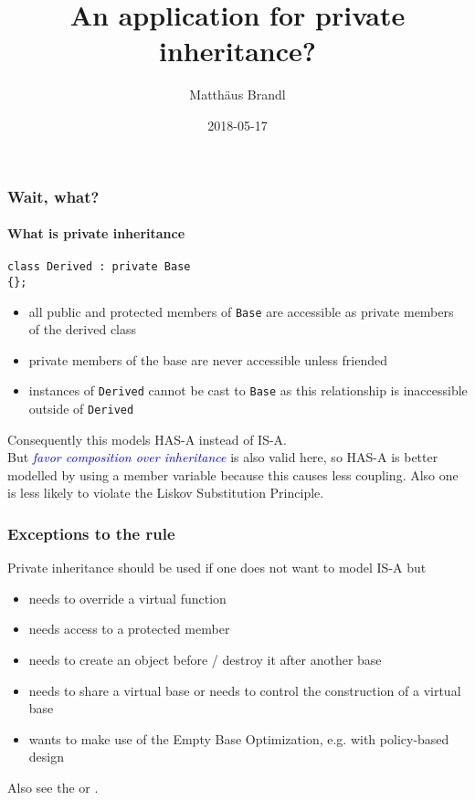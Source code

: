 \documentclass{beamer}
\title{An application for private inheritance?}
\author{Matth\"aus Brandl}
\institute{EOS GmbH}
\date{2018-05-17}
\def\code#1{\texttt{#1}}
\def\cite#1{\textit{\textcolor{blue}{#1}}}
\begin{document}

\frame{\titlepage}


\begin{frame}[fragile]
\frametitle{Wait, what?}
\framesubtitle{What is private inheritance}

\begin{lstlisting}
class Derived : private Base
{};
\end{lstlisting}

\begin{itemize}
\item all public and protected members of \code{Base} are accessible as private members of the derived class
\item private members of the base are never accessible unless friended
\item instances of \code{Derived} cannot be cast to \code{Base} as this relationship is inaccessible outside of \code{Derived}
\end{itemize}

Consequently this models HAS-A instead of IS-A.\\
But \cite{favor composition over inheritance} is also valid here, so HAS-A is better modelled by using a member variable because this causes less coupling. Also one is less likely to violate the Liskov Substitution Principle.
\end{frame}


\begin{frame}[fragile]
\frametitle{Exceptions to the rule}
Private inheritance should be used if one does not want to model IS-A but
\begin{itemize}
\item needs to override a virtual function
\item needs access to a protected member
\item needs to create an object before / destroy it after another base
\item needs to share a virtual base or needs to control the construction of a virtual base
\item wants to make use of the Empty Base Optimization, e.g. with policy-based design
\end{itemize}

Also see the \href{https://isocpp.org/wiki/faq/private-inheritance}{} or \href{https://en.cppreference.com/w/cpp/language/derived_class%23Private_inheritance}{\beamergotobutton{cppreference.com}}.
\end{frame}
\end{document}
